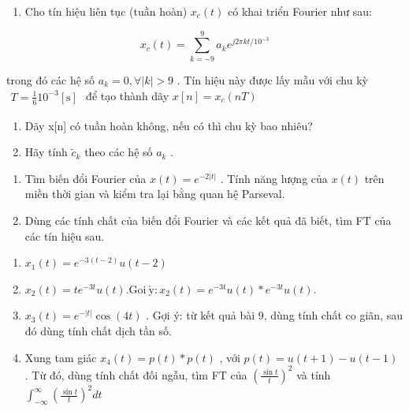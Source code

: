 \documentclass[
  10
]{article}
\providecommand{\tightlist}{%
  \setlength{\itemsep}{0pt}\setlength{\parskip}{0pt}}
\begin{document}
\begin{enumerate}
\def\labelenumi{\arabic{enumi}.}
\setcounter{enumi}{7}
\tightlist
\item
  Cho tín hiệu liên tục (tuần hoàn) \(x _ { c } ( t )\) có khai triển
  Fourier như sau:
\end{enumerate}

\[
x _ {c} (t) = \sum_ {k = - 9} ^ {9} a _ {k} e ^ {j 2 \pi k t / 1 0 ^ {- 3}}
\]

trong đó các hệ số \(a _ { k } = 0 , \forall | k | > 9\) . Tín hiệu này
được lấy mẫu với chu kỳ
\(\begin{array} { r } { T = \mathrm { \frac { 1 } { 6 } } 1 0 ^ { - 3 } \mathrm { [ s ] } } \end{array}\)
để tạo thành dãy \(x [ n ] = x _ { c } ( n T )\)

\begin{enumerate}
\def\labelenumi{\alph{enumi}.}
\item
  Dãy x{[}n{]} có tuần hoàn không, nếu có thì chu kỳ bao nhiêu?
\item
  Hãy tính \(\tilde { c } _ { k }\) theo các hệ số \(a _ { k }\) .
\end{enumerate}

\begin{enumerate}
\def\labelenumi{\arabic{enumi}.}
\setcounter{enumi}{8}
\item
  Tìm biến đổi Fourier của \(x ( t ) = e ^ { - 2 | t | }\) . Tính năng
  lượng của \(x ( t )\) trên miền thời gian và kiểm tra lại bằng quan hệ
  Parseval.
\item
  Dùng các tính chất của biến đổi Fourier và các kết quả đã biết, tìm FT
  của các tín hiệu sau.
\end{enumerate}

\begin{enumerate}
\def\labelenumi{(\alph{enumi})}
\item
  \(x _ { 1 } ( t ) = e ^ { - 3 ( t - 2 ) } u ( t - 2 )\)
\item
  \(x _ { 2 } ( t ) = t e ^ { - 3 t } u ( t ) . { \mathrm { G o i ~ } } \acute { \mathrm { y } } \colon x _ { 2 } ( t ) = e ^ { - 3 t } u ( t ) * e ^ { - 3 t } u ( t ) .\)
\item
  \(x _ { 3 } ( t ) = e ^ { - | t | } \cos ( 4 t )\) . Gợi ý: từ kết quả
  bài 9, dùng tính chất co giãn, sau đó dùng tính chất dịch tần số.
\item
  Xung tam giác \(x _ { 4 } ( t ) = p ( t ) * p ( t )\) , với
  \(p ( t ) = u ( t + 1 ) - u ( t - 1 )\) . Từ đó, dùng tính chất đối
  ngẫu, tìm FT của
  \(\textstyle \left( { \frac { \sin t } { t } } \right) ^ { 2 }\) và
  tính
  \(\textstyle \int _ { - \infty } ^ { \infty } \left( { \frac { \sin t } { t } } \right) ^ { 2 } d t\)
\end{enumerate}
\end{document}
